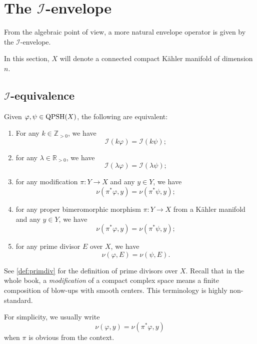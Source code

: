 \section{The \texorpdfstring{$\mathcal{I}$}{I}-envelope}\label{sec:Ienv}
From the algebraic point of view, a more natural envelope operator is given by the $\mathcal{I}$-envelope.

In this section, $X$ will denote a connected compact Kähler manifold of dimension $n$.


\subsection{\texorpdfstring{$\mathcal{I}$}{I}-equivalence}
\label{subsec:Iequiv}

\begin{proposition}\label{prop:Iequivchar}
    Given $\varphi,\psi\in \mathrm{QPSH}(X)$, the following are equivalent:
    \begin{enumerate}
        \item\label{itm:prop:Iequivchar:1} For any $k\in \mathbb{Z}_{>0}$, we have
        \[
            \mathcal{I}(k\varphi)=\mathcal{I}(k\psi);
        \]
        \item\label{itm:prop:Iequivchar:2} for any $\lambda\in \mathbb{R}_{>0}$, we have
            \[
            \mathcal{I}(\lambda\varphi)=\mathcal{I}(\lambda\psi);
            \]
        \item\label{itm:prop:Iequivchar:3} for any modification $\pi\colon Y\rightarrow X$ and any $y\in Y$, we have
            \[
                \nu(\pi^*\varphi,y)=\nu(\pi^*\psi,y);
            \]
        \item\label{itm:prop:Iequivchar:4} for any proper bimeromorphic morphism $\pi\colon Y\rightarrow X$ from a Kähler manifold and any $y\in Y$, we have
            \[
                \nu(\pi^*\varphi,y)=\nu(\pi^*\psi,y);
            \]
        \item\label{itm:prop:Iequivchar:5} for any prime divisor $E$ over $X$, we have
            \[
                \nu(\varphi,E)=\nu(\psi,E).
            \]
    \end{enumerate}
\end{proposition}
See \cref{def:primdiv} for the definition of prime divisors over $X$. Recall that in the whole book, a \emph{modification} of a compact complex space means a finite composition of blow-ups with smooth centers. This terminology is highly non-standard.

For simplicity, we usually write
\[
\nu(\varphi,y)=\nu(\pi^*\varphi,y)
\]
when $\pi$ is obvious from the context.


